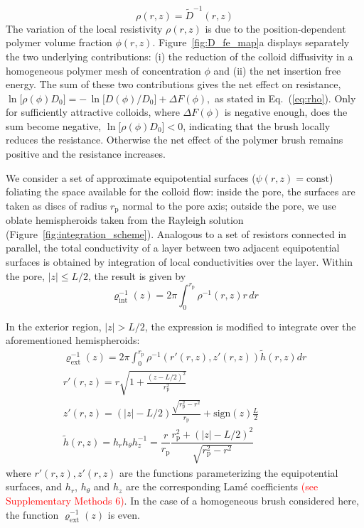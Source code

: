 \documentclass[12pt, a4paper]{article}
\newcommand\todo[1]{\textcolor{red}{#1}}
\begin{document}
\begin{equation}
    \rho(r,z)= \tilde{D}^{-1}(r,z)
    \label{eq:rho}
\end{equation}
The variation of the local resistivity $\rho(r,z)$ is due to the position-dependent polymer volume fraction $\phi(r,z)$.
Figure~\ref{fig:D_fe_map}a displays separately the two underlying contributions:
(i) the reduction of the colloid diffusivity in a homogeneous polymer mesh of concentration $\phi$ and 
(ii) the net insertion free energy.
The sum of these two contributions gives the net effect on resistance,
$\ln\!\bigl[\rho(\phi)D_{0}\bigr]= -\,\ln\!\bigl[D(\phi)/D_{0}\bigr] + \Delta F(\phi),$
as stated in Eq.~(\ref{eq:rho}).
Only for sufficiently attractive colloids, where $\Delta F(\phi)$ is negative enough, does the sum become negative, $\ln\!\bigl[\rho(\phi)D_{0}\bigr] < 0$, indicating that the brush locally reduces the resistance.
Otherwise the net effect of the polymer brush remains positive and the resistance increases.


We consider a set of approximate equipotential surfaces ($\psi(r,z)=\text{const}$) foliating the space available for the colloid flow: inside the pore, the surfaces are taken as  discs of radius $r_{\text{p}}$ normal to the pore axis; outside the pore, we use oblate hemispheroids taken from the Rayleigh solution \cite{Strutt1878} (Figure~\ref{fig:integration_scheme}).
Analogous to a set of resistors connected in parallel, the total conductivity of a layer between two adjacent equipotential surfaces is obtained by integration of local conductivities over the layer.
Within the pore, $|z|\leq L/2$, the result is given by
\begin{equation}
\varrho_{\text{int}}^{-1}(z)= 2\pi\int_{0}^{r_{\text{p}}^{}} \rho^{-1}(r,z) r \, dr
\label{eq:varrho1}
\end{equation}

In the exterior region, $|z| >L/2$, the expression is modified to integrate over the aforementioned hemispheroids:
\begin{equation}
    \begin{gathered}
        \varrho_{\text{ext}}^{-1}(z)= 2\pi\int_{0}^{r_{\text{p}}^{}} \rho^{-1}\left( r'(r,z), z'(r,z) \right)  \tilde{h} (r,z) dr\\
        r'(r,z) = r\sqrt{1 + \frac{(z - L/2)^2}{r_{\text{p}}^2}}\\
        z'(r,z) = (|z| - L/2) \frac{\sqrt{r_{\text{p}}^2 - r^2}}{r_{\text{p}}} +  \text{sign}(z) \frac{L}{2}\\
        \tilde{h} (r,z) = h_r h_{\theta} h_z^{-1} = \dfrac{r}{r_{\text{p}}}\dfrac{r_{\text{p}}^2 + (|z|-L/2)^2}{\sqrt{r_{\text{p}}^2 - r^2}}
    \end{gathered}
\label{eq:varrho2}
\end{equation}
where $r'(r,z) , z'(r,z)$ are the functions parameterizing the equipotential surfaces, and $h_r$, $h_{\theta}$ and $h_z$ are the corresponding Lam\'e coefficients 
\todo{(see Supplementary Methods 6)}.
In the case of a homogeneous brush considered here, the function $\varrho_{\text{ext}}^{-1}(z)$ is even.
\end{document}
